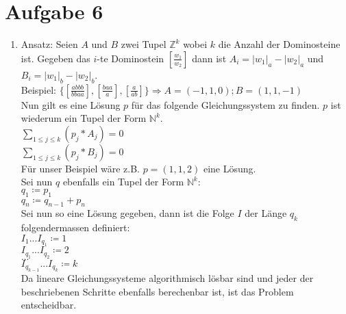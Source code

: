\documentclass[a4paper,11pt]{scrartcl}
\begin{document}
\newpage
	\section*{Aufgabe 6}
	\begin{enumerate}[label=\alph*)]
	\item	Ansatz: Seien $A$ und $B$ zwei Tupel $\mathbb{Z}^k$ wobei $k$ die Anzahl der Dominosteine ist. Gegeben das $i$-te Dominostein $\left[ \frac{w_1}{w_2}\right]$ dann ist $A_i = |w_1|_a - |w_2|_a$ und $B_i = |w_1|_b - |w_2|_b$.\\
			Beispiel: $\{\left[\frac{abbb}{bbaa}\right], \left[\frac{baa}{a}\right], \left[\frac{a}{ab}\right]\} \Rightarrow A = (-1, 1, 0); B = (1, 1, -1)$\\

			Nun gilt es eine Lösung $p$ für das folgende Gleichungssystem zu finden. $p$ ist wiederum ein Tupel der Form $\mathbb{N}^k$.\\
			$\sum_{1 \leq j \leq k}(p_j * A_j) = 0$\\
			$\sum_{1 \leq j \leq k}(p_j * B_j) = 0$\\
			Für unser Beispiel wäre z.B. $p = (1, 1, 2)$ eine Lösung.\\

			Sei nun $q$ ebenfalls ein Tupel der Form $\mathbb{N}^k$:\\
			$q_1 \coloneqq p_1$\\
			$q_n \coloneqq q_{n-1} + p_n$\\

			Sei nun so eine Lösung gegeben, dann ist die Folge $I$ der Länge $q_k$ folgendermassen definiert:\\
			$I_1 ... I_{q_1} \coloneqq 1$\\
			$I_{q_1} ... I_{q_2} \coloneqq 2$\\
			$...$\\
			$I_{q_{k-1}} ... I_{q_k} \coloneqq k$\\

			Da lineare Gleichungssysteme algorithmisch lösbar sind und jeder der beschriebenen Schritte ebenfalls berechenbar ist, ist das Problem entscheidbar.\\


\end{enumerate}
\end{document}
